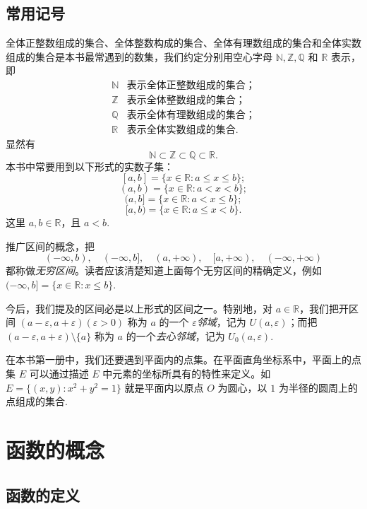 \subsection{常用记号}
\label{subsec:ma-1-1-5}

全体正整数组成的集合、全体整数构成的集合、全体有理数组成的集合和全体实数组成的集合是本书最常遇到的数集，我们约定分别用空心字母 $\mathbb{N},\mathbb{Z},\mathbb{Q}$ 和 $\mathbb{R}$ 表示，即
\[
\begin{array}{ll}
  \mathbb{N} & \text{表示全体正整数组成的集合；}\\
  \mathbb{Z} & \text{表示全体整数组成的集合；}\\
  \mathbb{Q} & \text{表示全体有理数组成的集合；}\\
  \mathbb{R} & \text{表示全体实数组成的集合.}
\end{array}
\]
显然有
\[
  \mathbb{N}\subset\mathbb{Z}\subset\mathbb{Q}\subset\mathbb{R}.
\]
本书中常要用到以下形式的实数子集：
\[
  [a,b]=\{x\in\mathbb{R}:a\leqslant x\leqslant b\};
\]
\[
  (a,b)=\{x\in\mathbb{R}:a<x<b\};
\]
\[
  (a,b]=\{x\in\mathbb{R}:a<x\leqslant b\};
\]
\[
  [a,b)=\{x\in\mathbb{R}:a\leqslant x<b\}.
\]
这里 $a,b\in\mathbb{R}$，且 $a<b$.

推广区间的概念，把
\[
  (-\infty,b),\quad (-\infty,b],\quad (a,+\infty),\quad [a,+\infty),\quad (-\infty,+\infty)
\]
都称做\emph{无穷区间}。读者应该清楚知道上面每个无穷区间的精确定义，例如 $(-\infty,b]=\{x\in\mathbb{R}:x\leqslant b\}$.

今后，我们提及的区间必是以上形式的区间之一。特别地，对 $a\in\mathbb{R}$，我们把开区间 $(a-\varepsilon,a+\varepsilon)(\varepsilon>0)$ 称为 $a$ 的一个 $\varepsilon$\emph{邻域}，记为 $U(a,\varepsilon)$；而把 $(a-\varepsilon,a+\varepsilon)\setminus\{a\}$ 称为 $a$ 的一个\emph{去心邻域}，记为 $U_0(a,\varepsilon)$.

在本书第一册中，我们还要遇到平面内的点集。在平面直角坐标系中，平面上的点集 $E$ 可以通过描述 $E$ 中元素的坐标所具有的特性来定义。如 $E=\{(x,y):x^2+y^2=1\}$ 就是平面内以原点 $O$ 为圆心，以 $1$ 为半径的圆周上的点组成的集合.

\section{函数的概念}
\label{sec:ma-1-2}

\subsection{函数的定义}
\label{subsec:ma-1-2-1}


